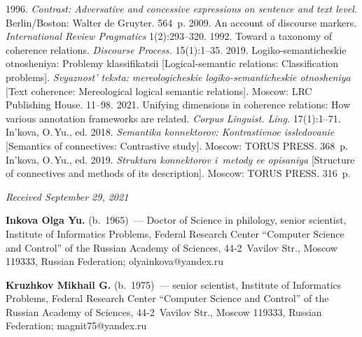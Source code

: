 \begin{multicols}{2}
{{\begin{thebibliography}{99}
 1996. \textit{Contrast: Adversative and concessive expressions on sentence and 
text level.} Berlin/Boston: Walter de Gruyter. 564~p.
 2009. An account of discourse markers. \textit{International Review Pragmatics} 
1(2):293--320.
 1992. Toward a taxonomy of coherence relations. 
\textit{Discourse Process.} 15(1):1--35.
 2019. Logiko-semanticheskie otnosheniya: Problemy klassifikatsii [Logical-semantic 
relations: Classification problems]. \textit{Svyaznost' teksta: mereologicheskie logiko-semanticheskie 
otnosheniya} [Text coherence: Mereological logical semantic relations]. Moscow: LRC Publishing House. 
11--98.
 2021. Unifying dimensions in coherence relations: How various annotation frameworks are 
related. \textit{Corpus Linguist. Ling.} 17(1):1--71.
In'kova, O.\,Yu., ed. 2018. \textit{Semantika konnektorov: Kontrastivnoe issledovanie} [Semantics of 
connectives: Contrastive study]. Moscow: TORUS PRESS. 368~p.
In'kova, O.\,Yu., ed. 2019. \textit{Struktura konnektorov i~metody ee opisaniya} [Structure of 
connectives and methods of its description]. Moscow: TORUS PRESS. 316~p.
\end{thebibliography}

 }
 }

\end{multicols}

\vspace*{-3pt}

\hfill{\small\textit{Received September 29, 2021}}


\vspace*{-14pt}

\Contr

\vspace*{-3pt}


\noindent
\textbf{Inkova Olga Yu.} (b.\ 1965)~--- Doctor of Science  in philology, senior scientist, Institute of 
Informatics Problems, Federal Research Center ``Computer Science and Control'' of the Russian 
Academy of Sciences, 44-2~Vavilov Str., Moscow 119333, Russian Federation; 
\mbox{olyainkova@yandex.ru}


\vspace*{3pt}

\noindent
\textbf{Kruzhkov Mikhail G.} (b.\ 1975)~--- senior scientist, Institute of Informatics Problems, Federal 
Research Center ``Computer Science and Control'' of the Russian Academy of Sciences, 44-2~Vavilov 
Str., Moscow 119333, Russian Federation; \mbox{magnit75@yandex.ru}



\label{end\stat}

\renewcommand{\bibname}{\protect\rm Литература} 
      
  